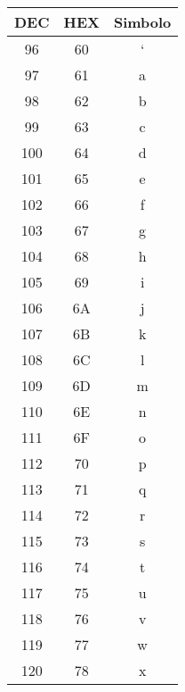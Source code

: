{\begin{table}[H]
\begin{minipage}[t]{.32\textwidth}
\begin{tabular}{ccc}
      \end{tabular}
    \end{minipage}
    \begin{minipage}[t]{.32\textwidth}
      \begin{tabular}{ccc}
        \hline\hline\textbf{DEC} & \textbf{HEX} & \textbf{Simbolo} \\\hline\hline
        96  & 60 & `                   \\ \hline
        97  & 61 & a                   \\ \hline
        98  & 62 & b                   \\ \hline
        99  & 63 & c                   \\ \hline
        100 & 64 & d                   \\ \hline
        101 & 65 & e                   \\ \hline
        102 & 66 & f                   \\ \hline
        103 & 67 & g                   \\ \hline
        104 & 68 & h                   \\ \hline
        105 & 69 & i                   \\ \hline
        106 & 6A & j                   \\ \hline
        107 & 6B & k                   \\ \hline
        108 & 6C & l                   \\ \hline
        109 & 6D & m                   \\ \hline
        110 & 6E & n                   \\ \hline
        111 & 6F & o                   \\ \hline
        112 & 70 & p                   \\ \hline
        113 & 71 & q                   \\ \hline
        114 & 72 & r                   \\ \hline
        115 & 73 & s                   \\ \hline
        116 & 74 & t                   \\ \hline
        117 & 75 & u                   \\ \hline
        118 & 76 & v                   \\ \hline
        119 & 77 & w                   \\ \hline
        120 & 78 & x                   \\ \hline

\end{tabular}
\end{minipage}
\end{table}}
